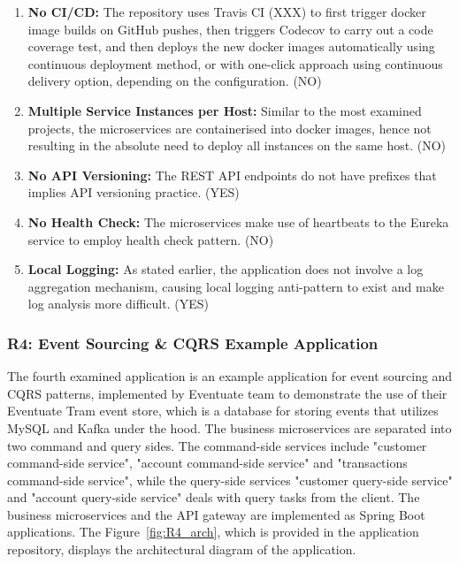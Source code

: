 \documentclass{Configuration_Files/PoliMi3i_thesis}
\begin{document}
\begin{enumerate}
    \item \textbf{No CI/CD:} The repository uses Travis CI (XXX) to first trigger docker image builds on GitHub pushes, then triggers Codecov to carry out a code coverage test, and then deploys the new docker images automatically using continuous deployment method, or with one-click approach using continuous delivery option, depending on the configuration. (NO)
    
    \item \textbf{Multiple Service Instances per Host:} Similar to the most examined projects, the microservices are containerised into docker images, hence not resulting in the absolute need to deploy all instances on the same host. (NO)
    
    \item \textbf{No API Versioning:} The REST API endpoints do not have prefixes that implies API versioning practice. (YES)
    
    \item \textbf{No Health Check:} The microservices make use of heartbeats to the Eureka service to employ health check pattern. (NO)
    
    \item \textbf{Local Logging:} As stated earlier, the application does not involve a log aggregation mechanism, causing local logging anti-pattern to exist and make log analysis more difficult. (YES)
\end{enumerate}

\subsubsection{R4: Event Sourcing \& CQRS Example Application}
\label{subsubsec:R4}

The fourth examined application is an example application for event sourcing and CQRS patterns, implemented by Eventuate team to demonstrate the use of their Eventuate Tram event store, which is a database for storing events that utilizes MySQL and Kafka under the hood.
The business microservices are separated into two command and query sides.
The command-side services include "customer command-side service", "account command-side service" and "transactions command-side service", while the query-side services "customer query-side service" and "account query-side service" deals with query tasks from the client.
The business microservices and the API gateway are implemented as Spring Boot applications.
The Figure~\ref{fig:R4_arch}, which is provided in the application repository, displays the architectural diagram of the application.
\end{document}

